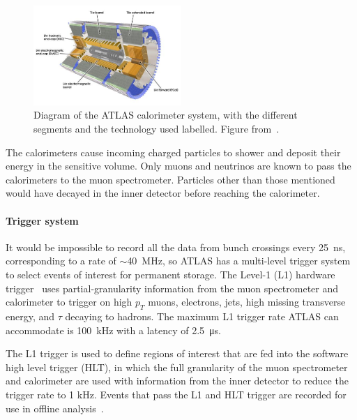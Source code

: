 \begin{figure}
    \centering
    \includegraphics[width = 0.5\textwidth]{figures/atlas_calorimeter.png}
    \caption{Diagram of the ATLAS calorimeter system, with the different segments and the technology used labelled. Figure from~\cite{collaboration_atlas_2008}.}
    \label{fig:atlas_calorimeter}
\end{figure}

The calorimeters cause incoming charged particles to shower and deposit their energy in the sensitive volume. Only muons and neutrinos are known to pass the calorimeters to the muon spectrometer.  Particles other than those mentioned would have decayed in the inner detector before reaching the calorimeter. 

\paragraph*{Trigger system} \hfill \break
It would be impossible to record all the data from bunch crossings every \SI{25}{\nano\second}, corresponding to a rate of $\sim$\SI{40}{MHz}, so ATLAS has a multi-level trigger system to select events of interest for permanent storage. The Level-1 (L1) hardware trigger~\cite{atlas_l1_trigger_tdr} uses partial-granularity information from the muon spectrometer and calorimeter to trigger on high $p_T$ muons, electrons, jets, high missing transverse energy, and $\tau$ decaying to hadrons. The maximum L1 trigger rate ATLAS can accommodate is \SI{100}{kHz} with a latency of \SI{2.5}{\micro\second}. 


The L1 trigger is used to define regions of interest that are fed into the software high level trigger (HLT), in which the full granularity of the muon spectrometer and calorimeter are used with information from the inner detector to reduce the trigger rate to 1 kHz. Events that pass the L1 and HLT trigger are recorded for use in offline analysis~\cite{atlas_hlt_trigger_tdr}.

